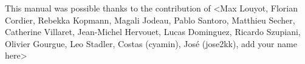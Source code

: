 \documentclass[Sisyphe]{../../data/TelemacDoc} %
\begin{document}
\let\cleardoublepage\clearpage

\setlength\parindent{0pt}

\title{\sisyphe}
\subtitle{User Manual}
\version{\telmaversion}
\date{\today}
\maketitle
\clearpage



\newpage

\thispagestyle{empty}

\TelemacCopyright{}




\pagestyle{empty} %

\tableofcontents%


\pagestyle{fancy} %

\pagebreak
This manual was possible thanks to the contribution of <Max Louyot, Florian Cordier, Rebekka Kopmann, Magali Jodeau, Pablo Santoro, Matthieu Secher, Catherine Villaret, Jean-Michel Hervouet, Lucas Dominguez, Ricardo Szupiani, Olivier Gourgue, Leo Stadler, Costas (cyamin), Jos\'e (jose2kk), add your name here>
\pagebreak



\end{document}

